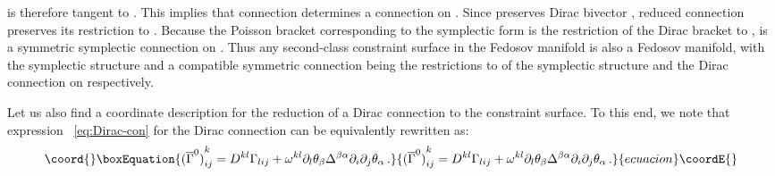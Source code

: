 \documentclass[a4paper,11pt]{amsart}
\numberwithin{thm}{section} %
\numberwithin{equation}{section} %
\numberwithin{figure}{section} %
\renewcommand{\:}{{\rm\, :\,}}
\def\bar{\overline}
\def\d{\partial}
\providecommand{\sdl}[1]{\frac{{\d}}{\d #1}}
\def\manM{{\mathcal M}}
\def\con{{\bar\Gamma}}
\def\Dcon-d{{\bar\nabla}^0}
\begin{document}
\myHighlight{$\Dcon-d_Y Z$}\coordHE{} is therefore tangent to \myHighlight{$\Sigma$}\coordHE{}.  This implies that
connection \myHighlight{$\con^0$}\coordHE{} determines a connection \myHighlight{$(\con^0)^\Sigma$}\coordHE{} on
\myHighlight{$\Sigma$}\coordHE{}.  Since \myHighlight{$\con^0$}\coordHE{} preserves Dirac bivector \myHighlight{$D^{ij}\sdl{x^i}
\wedge \sdl{x^j}$}\coordHE{}, reduced connection \myHighlight{$(\con^0)^\Sigma$}\coordHE{} preserves its
restriction to \myHighlight{$\Sigma$}\coordHE{}.  Because the Poisson bracket corresponding to the
symplectic form \myHighlight{$\omega^\Sigma=\omega\bigr|_{\Sigma}$}\coordHE{} is the restriction
of the Dirac bracket to \myHighlight{$\Sigma$}\coordHE{} , \myHighlight{$(\con^0)^\Sigma$}\coordHE{} is a symmetric
symplectic connection on \myHighlight{$\Sigma$}\coordHE{}.  Thus any second-class constraint
surface in the Fedosov manifold is also a Fedosov manifold, with the
symplectic structure and a compatible symmetric connection being
the restrictions to \myHighlight{$\Sigma$}\coordHE{} of the symplectic structure and
the Dirac connection on \myHighlight{$\manM$}\coordHE{} respectively.

Let us also find a coordinate description for the reduction
of a Dirac connection to the constraint surface.
To this end, we note that expression ~\eqref{eq:Dirac-con} for the
Dirac connection can be equivalently rewritten as:
\begin{equation}\coord{}\boxEquation{
{(\con^0)}^k_{ij}=D^{kl}\Gamma_{lij}+
\omega^{kl}\d_l \theta_\beta \Delta^{\beta\alpha} \d_i \d_j \theta_\alpha \,.
}{
{(\con^0)}^k_{ij}=D^{kl}\Gamma_{lij}+
\omega^{kl}\d_l \theta_\beta \Delta^{\beta\alpha} \d_i \d_j \theta_\alpha \,.
}{ecuacion}\coordE{}\end{equation}
\end{document}
